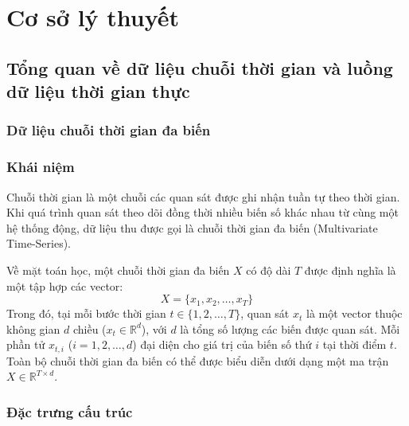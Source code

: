 \section{Cơ sở lý thuyết}
\subsection{Tổng quan về dữ liệu chuỗi thời gian và luồng dữ liệu thời gian thực}
\subsubsection{Dữ liệu chuỗi thời gian đa biến}
    \subsubsection*{Khái niệm}
    
    Chuỗi thời gian là một chuỗi các quan sát được ghi nhận tuần tự theo thời gian. Khi quá trình quan sát theo dõi đồng thời nhiều biến số khác nhau từ cùng một hệ thống động, dữ liệu thu được gọi là chuỗi thời gian đa biến (Multivariate Time-Series).
    
    Về mặt toán học, một chuỗi thời gian đa biến $X$ có độ dài $T$ được định nghĩa là một tập hợp các vector:
    $$X = \{x_1, x_2, \dots, x_T\}$$
    Trong đó, tại mỗi bước thời gian $t \in \{1, 2, \dots, T\}$, quan sát $x_t$ là một vector thuộc không gian $d$ chiều ($x_t \in \mathbb{R}^d$), với $d$ là tổng số lượng các biến được quan sát. Mỗi phần tử $x_{t, i}$ ($i = 1, 2, \dots, d$) đại diện cho giá trị của biến số thứ $i$ tại thời điểm $t$. Toàn bộ chuỗi thời gian đa biến có thể được biểu diễn dưới dạng một ma trận $X \in \mathbb{R}^{T \times d}$.
    
    \subsubsection*{Đặc trưng cấu trúc}
    
